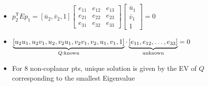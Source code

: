 \documentclass[a4paper]{article}
\newcommand{\transpose}{\mathsf{T}}
\begin{document}
\begin{itemize}
\begin{itemize}
            \item $p_2^\transpose E p_1 = [\bar u_2, \bar v_2, 1]
                \begin{bmatrix}
                    e_11 & e_12 & e_13\\
                    e_21 & e_22 & e_23\\
                    e_31 & e_32 & e_33
                \end{bmatrix}
                \begin{bmatrix}
                    \bar u_1\\
                    \bar v_1\\
                    1
                \end{bmatrix} = 0$
            \item $\underbrace{[u_2u_1, u_2v_1, u_2, v_2u_1, v_2v_1, v_2, u_1, v_1, 1]}_{Q: \text{known}} \cdot \linebreak \underbrace{[e_{11}, e_{12}, \dots, e_{33}]}_{\text{unknown}} = 0$
            \item For $8$ non-coplanar pts, unique solution is given by the EV of $Q$ corresponding to the smallest Eigenvalue
        \end{itemize}
\end{itemize}
\end{document}
